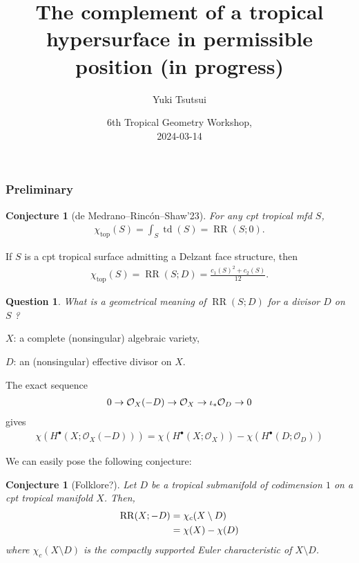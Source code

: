 \documentclass[dvipdfmx,12pt]{beamer}%
\title[{The complement of a tropical 
hypersurface}]{The complement of a tropical 
hypersurface in permissible position (in progress)}
\author[Y. Tsutsui]{Yuki Tsutsui}
\institute[UT]{Graduate School of Mathematical Sciences \and University of Tokyo}
\date{6th Tropical Geometry Workshop,\\

2024-03-14}
\newtheorem{question}[theorem]{Question}
\newtheorem{conjecture}[theorem]{Conjecture}
\theoremstyle{definition}
\newcommand{\opn}[1]{\operatorname{#1}}
\begin{document}
\setlength{\abovedisplayskip}{3pt}
\setlength{\belowdisplayskip}{3pt}

\maketitle

\begin{frame}
\frametitle{Preliminary}
\end{frame}

\begin{frame}


\begin{conjecture}[{de Medrano--Rinc\'on--Shaw'23}]
For any cpt tropical mfd $S$, 
\begin{align}
\chi_{\opn{top}}(S)=\int_{S}\opn{td}(S)=\opn{RR}(S;0).
\end{align}
\end{conjecture}

\begin{theorem}
If $S$ is a cpt tropical 
surface admitting a
Delzant face structure, then
\begin{align}
\chi_{\opn{top}}(S)=\opn{RR}(S;D)=\frac{c_1(S)^2+c_2(S)}{12}.
\end{align}

\end{theorem}

\begin{question}
What is a geometrical meaning of $\opn{RR}(S;D)$ for 
a divisor $D$ on $S$ ?
\end{question}

\end{frame}

\begin{frame}

$X$: a complete (nonsingular) algebraic variety,

$D$: an (nonsingular) effective divisor on $X$.

The exact sequence
\begin{align}
0 \to \mathcal{O}_X(-D)\to
\mathcal{O}_X
\to \iota_{*}\mathcal{O}_D \to 0 \notag
\end{align}
gives 
\begin{align}
\chi (H^\bullet(X;\mathcal{O}_X(-D)))=
\chi (H^\bullet(X;\mathcal{O}_X))-
\chi (H^\bullet(D;\mathcal{O}_D))
\end{align}

We can easily pose the following conjecture:
\begin{conjecture}[Folklore?]
\label{conjecture-rr-euler}
Let $D$ be a tropical submanifold of codimension $1$ on
a cpt tropical manifold $X$. Then,
\begin{align}
\opn{RR}(X;-D)&=\chi_{c}(X\setminus D) \\
&=\chi(X)-\chi(D) \notag
\end{align}
where $\chi_{c}(X\setminus D)$
is the compactly supported Euler 
characteristic of $X\setminus D$. 
 
\end{conjecture}

\end{frame}
\end{document}
